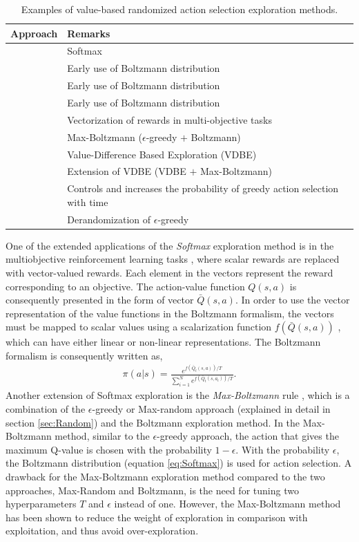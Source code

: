 \begin{table}
    \centering
    \begin{tabular}{p{5cm}|p{7cm}}
        Approach &  Remarks \\
        \hline
        & Softmax
        \\
        & Early use of Boltzmann distribution
        \\
        & Early use of Boltzmann distribution
        \\
        & Early use of Boltzmann distribution
        \\
        & Vectorization of rewards in multi-objective tasks
        \\
        & Max-Boltzmann ($\epsilon$-greedy $+$ Boltzmann)
        \\
        & Value-Difference Based Exploration (VDBE)
        \\
        & Extension of VDBE (VDBE $+$ Max-Boltzmann)
        \\
        & Controls and increases the probability of greedy action selection with time
        \\
        & Derandomization of $\epsilon$-greedy
    \end{tabular}
    \caption{Examples of value-based randomized action selection exploration methods.}
    \label{tab:valueBased}
\end{table}
One of the extended applications of the \emph{Softmax} exploration method is in the multiobjective reinforcement learning tasks , where scalar rewards are replaced with vector-valued rewards. Each element in the vectors represent the reward corresponding to an objective. The action-value function $Q(s,a)$ is consequently presented in the form of vector $\bar{Q}(s,a)$. In order to use the vector representation of the value functions in the Boltzmann formalism, the vectors must be mapped to scalar values using a scalarization function $f(\bar{Q}(s,a))$ , which can have either linear  or non-linear  representations. The Boltzmann formalism is consequently written as,
\begin{align}
\pi\left(a|s\right)=\frac{e^{f\left(\bar{Q}_t\left(s,a\right)\right)/T}}{\sum_{i=1}^{N}e^{f\left(\bar{Q}_t\left(s,a_i\right)\right)/T}}.
\end{align}
Another extension of Softmax exploration is the \emph{Max-Boltzmann} rule , which is a combination of the $\epsilon$-greedy or Max-random approach (explained in detail in section \ref{sec:Random}) and the Boltzmann exploration method. In the Max-Boltzmann method, similar to the $\epsilon$-greedy approach, the action that gives the maximum Q-value is chosen with the probability $1-\epsilon$. With the probability $\epsilon$, the Boltzmann distribution (equation \ref{eq:Softmax}) is used for action selection. A drawback for the Max-Boltzmann exploration method compared to the two approaches, Max-Random and Boltzmann, is the need for tuning two hyperparameters $T$ and $\epsilon$ instead of one. However, the Max-Boltzmann method has been shown to reduce the weight of exploration in comparison with exploitation, and thus avoid over-exploration.

